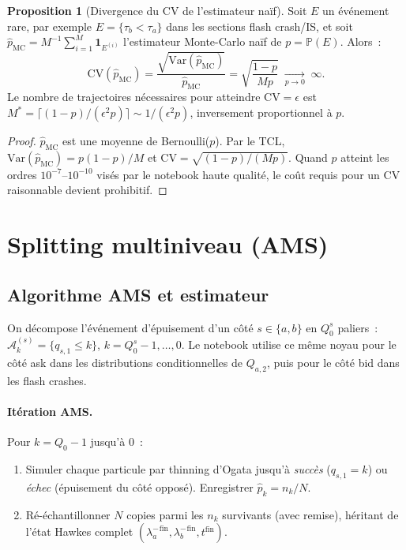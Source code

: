 \documentclass[11pt,a4paper]{article}
\theoremstyle{definition}
\newtheorem{proposition}{Proposition}[section]
\newcommand{\Pb}{\mathbb{P}}
\newcommand{\Var}{\mathrm{Var}}
\newcommand{\la}{\lambda_a^-}
\newcommand{\lb}{\lambda_b^-}
\begin{document}
\begin{proposition}[Divergence du CV de l'estimateur naïf]
\label{prop:cv_mc}
Soit $E$ un événement rare, par exemple $E=\{\tau_b<\tau_a\}$ dans les
sections flash crash/IS, et soit
$\hat p_\mathrm{MC} = M^{-1}\sum_{i=1}^M \mathbf{1}_{E^{(i)}}$
l'estimateur Monte-Carlo naïf de $p=\Pb(E)$. Alors~:
\[
  \mathrm{CV}(\hat p_\mathrm{MC})
  = \frac{\sqrt{\Var(\hat p_\mathrm{MC})}}{\hat p_\mathrm{MC}}
  = \sqrt{\frac{1-p}{Mp}} \;\xrightarrow[p\to 0]{}\; \infty.
\]
Le nombre de trajectoires nécessaires pour atteindre $\mathrm{CV}=\epsilon$ est
$M^*=\lceil(1-p)/(\epsilon^2 p)\rceil \sim 1/(\epsilon^2 p)$, inversement
proportionnel à $p$.
\end{proposition}

\begin{proof}
$\hat p_\mathrm{MC}$ est une moyenne de Bernoulli($p$). Par le TCL,
$\Var(\hat p_\mathrm{MC})=p(1-p)/M$ et
$\mathrm{CV}=\sqrt{(1-p)/(Mp)}$.
Quand $p$ atteint les ordres $10^{-7}$--$10^{-10}$ visés par le notebook haute
qualité, le coût requis pour un CV raisonnable devient prohibitif.
\end{proof}

\section{Splitting multiniveau (AMS)}
\label{sec:ams}

\subsection{Algorithme AMS et estimateur}

On décompose l'événement d'épuisement d'un côté $s\in\{a,b\}$ en $Q_0^s$
paliers~:
$\mathcal{A}^{(s)}_k=\{q_{s,1}\le k\}$, $k=Q_0^s-1,\ldots,0$.
Le notebook utilise ce même noyau pour le côté ask dans les distributions
conditionnelles de $Q_{a,2}$, puis pour le côté bid dans les flash crashes.

\paragraph{Itération AMS.} Pour $k=Q_0-1$ jusqu'à $0$~:
\begin{enumerate}[leftmargin=1.6em,itemsep=1pt]
  \item Simuler chaque particule par thinning d'Ogata jusqu'à
        \textit{succès} ($q_{s,1}=k$) ou \textit{échec} (épuisement du côté opposé).
        Enregistrer $\hat p_k=n_k/N$.
  \item Ré-échantillonner $N$ copies parmi les $n_k$ survivants
        (avec remise), héritant de l'état Hawkes complet
        $({\la}^\mathrm{fin},{\lb}^\mathrm{fin},t^\mathrm{fin})$.
\end{enumerate}
\end{document}
